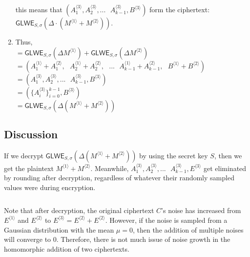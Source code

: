 \begin{myproof}
\begin{enumerate}
this means that $(A_1^{\langle 3 \rangle}, A_2^{\langle 3 \rangle}, ... \text{ } A_{k-1}^{\langle 3 \rangle}, B^{\langle 3 \rangle})$ form the ciphertext: $\textsf{GLWE}_{S, \sigma}(\Delta \cdot (M^{\langle 1 \rangle} + M^{\langle 2 \rangle}))$. \\
\item Thus, \\
$= \textsf{GLWE}_{S, \sigma}(\Delta M^{\langle 1 \rangle}) + \textsf{GLWE}_{S, \sigma}(\Delta M^{\langle 2 \rangle})$ \\
$ = ( A_1^{\langle 1 \rangle} + A_1^{\langle 2 \rangle}, \text{ } A_2^{\langle 1 \rangle} + A_2^{\langle 2 \rangle}, \text{ } ... \text{ } A_{k-1}^{\langle 1 \rangle} + A_{k-1}^{\langle 2 \rangle}, \text{ } B^{\langle 1 \rangle} + B^{\langle 2 \rangle} )$ \\
$ = ( A_1^{\langle 3 \rangle}, A_2^{\langle 3 \rangle}, ... \text{ } A_{k-1}^{\langle 3 \rangle}, B^{\langle 3 \rangle})$ \\
$ = ( \{A_i^{\langle 3 \rangle}\}_{i=0}^{k-1}, B^{\langle 3 \rangle})$ \\
$= \textsf{GLWE}_{S, \sigma}(\Delta (M^{\langle 1 \rangle} + M^{\langle 2 \rangle}))$


\end{enumerate}
\end{myproof}

\subsection{Discussion}
\label{subsubsec:glwe-add-cipher-discuss} 

 If we decrypt $\textsf{GLWE}_{S, \sigma}(\Delta(M^{\langle 1 \rangle} + M^{\langle 2 \rangle}))$ by using the secret key $S$, then we get the plaintext $M^{\langle 1 \rangle} + M^{\langle 2 \rangle}$. Meanwhile, $A_1^{\langle 3 \rangle}, A_2^{\langle 3 \rangle}, ... \text{ } A_{k-1}^{\langle 3 \rangle}, E^{\langle 3 \rangle}$ get eliminated by rounding after decryption, regardless of whatever their randomly sampled values were during encryption.

$ $

 Note that after decryption, the original ciphertext $C$'s noise has increased from $E^{\langle 1 \rangle}$ and $E^{\langle 2 \rangle}$ to $E^{\langle 3 \rangle} = E^{\langle 2 \rangle} + E^{\langle 2 \rangle}$. However, if the noise is sampled from a Gaussian distribution with the mean $\mu = 0$, then the addition of multiple noises will converge to 0. Therefore, there is not much issue of noise growth in the homomorphic addition of two ciphertexts. 

